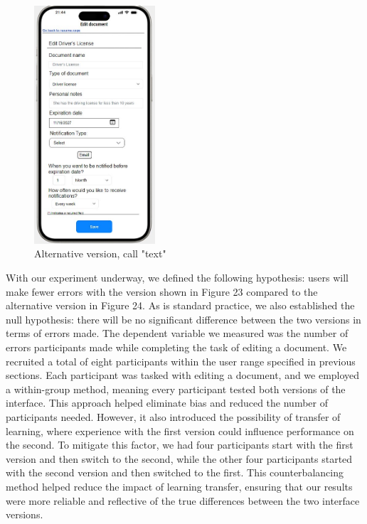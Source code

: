 			\begin{figure}[htbp]
				\centering
				\includegraphics[width=0.4\textwidth]{../mockups/go_back_variant.jpg}  %
				\caption{Alternative version, call "text"}
			\end{figure}
			\noindent
			With our experiment underway, we defined the following hypothesis: users will make fewer errors with the version shown in Figure 23 compared to the alternative version in Figure 24. As is standard practice, we also established the null hypothesis: there will be no significant difference between the two versions in terms of errors made. The dependent variable we measured was the number of errors participants made while completing the task of editing a document.\newline		
			We recruited a total of eight participants within the user range specified in previous sections. Each participant was tasked with editing a document, and we employed a within-group method, meaning every participant tested both versions of the interface. This approach helped eliminate bias and reduced the number of participants needed. However, it also introduced the possibility of transfer of learning, where experience with the first version could influence performance on the second.\newline
			To mitigate this factor, we had four participants start with the first version and then switch to the second, while the other four participants started with the second version and then switched to the first. This counterbalancing method helped reduce the impact of learning transfer, ensuring that our results were more reliable and reflective of the true differences between the two interface versions.\\
			\clearpage
